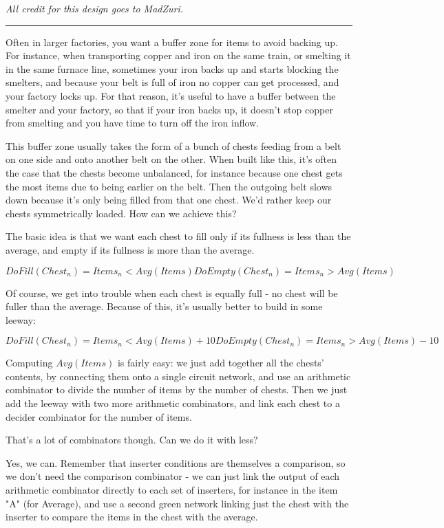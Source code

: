 \documentclass{article}
\begin{document}
\emph{All credit for this design goes to MadZuri.}

\rule{10cm}{1pt}

Often in larger factories, you want a buffer zone for items to avoid backing up. For instance, when transporting copper and iron on the same train, or smelting it in the same furnace line, sometimes your iron backs up and starts blocking the smelters, and because your belt is full of iron no copper can get processed, and your factory locks up. For that reason, it's useful to have a buffer between the smelter and your factory, so that if your iron backs up, it doesn't stop copper from smelting and you have time to turn off the iron inflow.

This buffer zone usually takes the form of a bunch of chests feeding from a belt on one side and onto another belt on the other. When built like this, it's often the case that the chests become unbalanced, for instance because one chest gets the most items due to being earlier on the belt. Then the outgoing belt slows down because it's only being filled from that one chest. We'd rather keep our chests symmetrically loaded. How can we achieve this?

The basic idea is that we want each chest to fill only if its fullness is less than the average, and empty if its fullness is more than the average.

$$
DoFill(Chest_n) = Items_n \lt Avg(Items)

DoEmpty(Chest_n) = Items_n \gt Avg(Items)
$$

Of course, we get into trouble when each chest is equally full - no chest will be fuller than the average. Because of this, it's usually better to build in some leeway:

$$
DoFill(Chest_n) = Items_n \lt Avg(Items) + 10

DoEmpty(Chest_n) = Items_n \gt Avg(Items) - 10
$$

Computing $Avg(Items)$ is fairly easy: we just add together all the chests' contents, by connecting them
onto a single circuit network, and use an arithmetic combinator to divide the number of items by the number of chests. Then we just add the leeway with two more arithmetic combinators, and link each chest to a decider combinator for the number of items.

That's a lot of combinators though. Can we do it with less?

Yes, we can. Remember that inserter conditions are themselves a comparison, so we don't need the comparison combinator - we can just link the output of each arithmetic combinator directly to each set of inserters, for instance in the item "A" (for Average), and use a second green network linking just the chest with the inserter to compare the items in the chest with the average.
\end{document}
